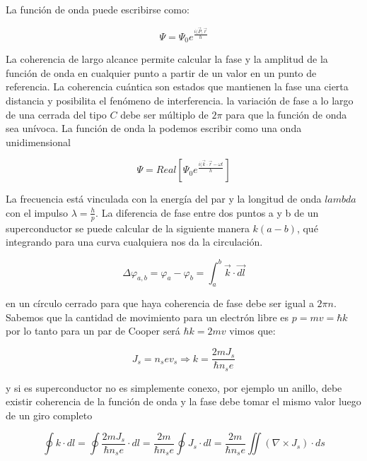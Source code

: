 La función de onda puede escribirse como:

\begin{equation}
	\Psi=\Psi_{0}e^{\frac{i(\vec{P},\vec{r}}{h}}
\end{equation}

La coherencia de largo alcance permite calcular la fase y la amplitud de la función de onda en cualquier punto a partir de un valor en un punto de referencia. La coherencia cuántica son estados que mantienen la fase una cierta distancia y posibilita el fenómeno de interferencia. la variación de fase a lo largo de una cerrada del tipo $C$ debe ser múltiplo de $2\pi$ para que la función de onda sea unívoca. La función de onda la podemos escribir como una onda unidimensional

\begin{equation}
	\Psi =  Real \left[ \Psi_{0}e^{\frac{i(\vec{k}\cdot \vec{r}-\omega t}{h}}\right] 
\end{equation}


La frecuencia está vinculada con la energía del par y la longitud de onda $lambda$ con el impulso $\lambda= \frac{h}{p}$. La diferencia de fase entre dos puntos a y b de un superconductor se puede calcular de la siguiente manera $k(a-b)$, qué integrando para una curva cualquiera nos da la circulación.

\begin{equation}
	\Delta\varphi_{a,b}=\varphi_{a}-\varphi_{b}=\int_{a}^{b}\overrightarrow{k}\cdot \overrightarrow{dl} 
\end{equation}

en un círculo cerrado para que haya coherencia de fase debe ser igual a $2\pi n$. Sabemos que la cantidad de movimiento para un electrón libre es $p=mv=\hbar k$ por lo tanto para un par de Cooper será $\hbar k = 2mv$ vimos que:

\begin{equation}
	J_{s}=n_{s}ev_{s} \Rightarrow k= \frac{2mJ_{s}}{\hbar n_{s} e}
\end{equation}

y si es superconductor no es simplemente conexo, por ejemplo un anillo, debe existir coherencia de la función de onda y la fase debe tomar el mismo valor luego de un giro completo

\begin{equation}
	\oint k \cdot dl= \oint \frac{2mJ_{s}}{\hbar n_{s} e} \cdot dl = \frac{2m}{\hbar n_{s} e} \oint J_{s} \cdot dl = \frac{2m}{\hbar n_{s} e} \iint(\nabla \times J_{s}) \cdot ds
\end{equation}


